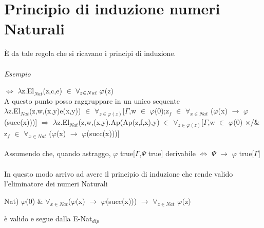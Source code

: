 \section{Principio di induzione numeri Naturali}
\label{sec:principio-di-induzione-numeri-Naturali}
\begin{prooftree}
\end{prooftree}
\noindent
\`E da tale regola che si ricavano i principi di induzione.\\\\
\noindent
\textit{Esempio}
\begin{prooftree}
\end{prooftree}
\noindent
$\Leftrightarrow$ $\lambda$z.El$_{Nat}$(z,c,e) $\in$ $\forall_{z \in Nat} \hspace{0.1cm}\varphi$(z)\\
A questo punto posso raggruppare in un unico sequente\\
$\lambda$z.El$_{Nat}$(z,w,(x,y)e(x,y)) $\in$ $\forall_{z \in \varphi(z)}$[$\Gamma$,w $\in$ $\varphi$(0);z$_f$ $\in$ $\forall_{x \in Nat}$ ($\varphi$(x) $\rightarrow$ $\varphi$(succ(x)))] $\Rightarrow$
$\lambda$z.El$_{Nat}$(z,w,(x,y).Ap(Ap(z,f,x),y) $\in$ $\forall_{z \in \varphi(z)}$[$\Gamma$,w $\in$ $\varphi$(0) $\times$/$\&$ z$_f$ $\in$ $\forall_{x \in Nat}$ ($\varphi$(x) $\rightarrow$ $\varphi$(succ(x)))]\\\\
\noindent
Assumendo che, quando astraggo, $\varphi$ true[$\Gamma$,$\Psi$ true] derivabile $\Leftrightarrow$ $\Psi$ $\rightarrow$ $\varphi$ true[$\Gamma$]\\\\
\noindent
In questo modo arrivo ad avere il principio di induzione che rende valido l'eliminatore dei numeri Naturali\\
\begin{center}Nat) $\varphi$(0) $\&$ $\forall_{x \in Nat}$($\varphi$(x) $\rightarrow$ $\varphi$(succ(x))) $\rightarrow$ $\forall_{z \in Nat}$ $\varphi$(z)\end{center}
\`e valido e segue dalla E-Nat$_{dip}$

